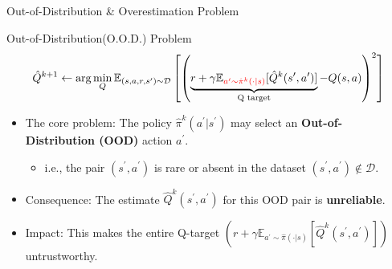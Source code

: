 \documentclass[11pt]{beamer}
\newcommand{\mbb}[1]{\mathbb{#1}}
\newcommand{\mc}[1]{\mathcal{#1}}
\newcommand{\tb}[1]{\textbf{#1}}
\begin{document}
\begin{frame}{Out-of-Distribution \& Overestimation Problem}
    \begin{block}{Out-of-Distribution(O.O.D.) Problem}
        \[
            \hat{Q}^{k+1} \leftarrow \arg \min_Q \mbb{E}_{(s,a,r,s^\prime) \sim \mc{D}}\left[\left(\underbrace{r + \gamma \mbb{E}_{\textcolor{red}{a^\prime \sim \hat{\pi}^k(\cdot|s)}}[\hat{Q}^k (s^\prime, a^\prime)]}_{\text{Q target}}- Q(s,a)\right)^2 \right]
        \]
        \begin{itemize}
            \item The core problem: The policy $\hat{\pi}^k (a^\prime|s^\prime)$ may select an \tb{Out-of-Distribution (OOD)} action $a^\prime$.
            \begin{itemize}
                \item i.e., the pair $(s^\prime, a^\prime)$ is rare or absent in the dataset $(s^\prime, a^\prime) \notin \mc{D}$.
            \end{itemize}
            \item Consequence: The estimate $\hat{Q}^k(s^\prime, a^\prime)$ for this OOD pair is \tb{unreliable}.
            \item Impact: This makes the entire Q-target $\left( r+ \gamma \mbb{E}_{a^\prime \sim \hat{\pi}(\cdot|s)}[\hat{Q}^k (s^\prime, a^\prime)]\right)$ untrustworthy.
        \end{itemize}
    \end{block}
\end{frame}
\end{document}
